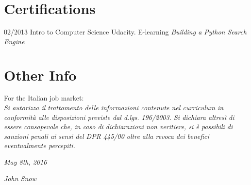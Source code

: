 \documentclass[]{friggeri-cv}
\begin{document}
\section{Certifications}
\begin{entrylist}
  \entry
    {02/2013}
    {Intro to Computer Science}
    {Udacity. E-learning}
    {\emph{Building a Python Search Engine}}
\end{entrylist}

\section{Other Info}
For the Italian job market:\\
\emph{Si autorizza il trattamento delle informazioni contenute nel curriculum in conformità alle disposizioni previste dal d.lgs. 196/2003. Si dichiara altresì di essere consapevole che, in caso di dichiarazioni non veritiere, si è passibili di sanzioni penali ai sensi del DPR 445/00 oltre alla revoca dei benefici eventualmente percepiti.}
\\
\begin{flushleft}
\emph{May 8th, 2016}
\end{flushleft}
\begin{flushright}
\emph{John Snow}
\end{flushright}
\end{document}
